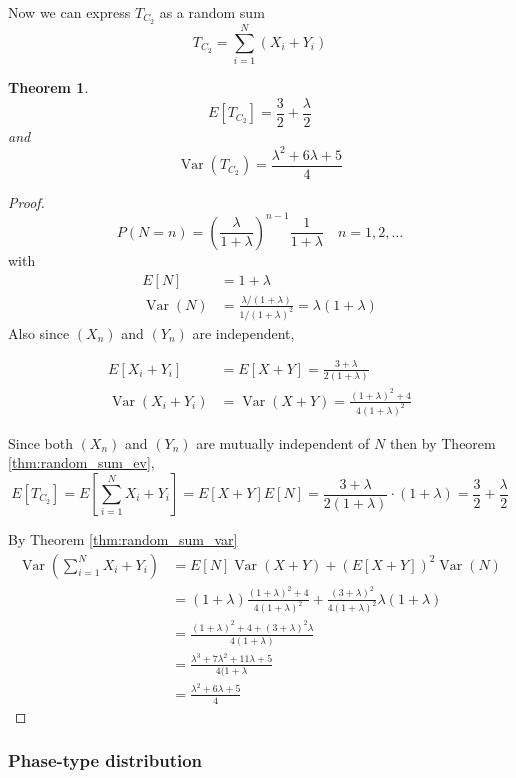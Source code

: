 \documentclass{article}
\theoremstyle{plain}
\newtheorem{theorem}{Theorem}[section]
\theoremstyle{definition}
\theoremstyle{remark}
\numberwithin{equation}{section}
\newcommand{\Var}{\operatorname {Var}}
\begin{document}
Now we can express $T_{C_2}$ as a random sum
$$
T_{C_2} = \sum_{i = 1}^N (X_i + Y_i)
$$

\begin{theorem}
$$
E[T_{C_2}] = \frac{3}{2} + \frac{\lambda}{2}
$$
and
$$
\Var(T_{C_2}) = \frac{\lambda^2 + 6 \lambda + 5}{4}
$$
\end{theorem}

\begin{proof}
$$
P(N = n) = \left(\frac{\lambda}{1 + \lambda} \right)^{n - 1} \frac{1}{1 + \lambda} \quad n = 1,2,\ldots
$$
with
\begin{align*}
    E[N] &= 1 + \lambda\\
    \Var(N) &= \frac{\lambda/(1 + \lambda)}{1/(1 + \lambda)^2} = \lambda (1 + \lambda)
\end{align*}
Also since $(X_n)$ and $(Y_n)$ are independent,

\begin{align*}
    E[X_i + Y_i] &= E[X + Y] = \frac{3 + \lambda}{2(1 + \lambda)}\\
    \Var(X_i + Y_i) &= \Var(X + Y) = \frac{(1 + \lambda)^2 + 4}{4(1 + \lambda)^2}
\end{align*}

Since both $(X_n)$ and $(Y_n)$ are mutually independent of $N$ then by Theorem \eqref{thm:random_sum_ev},
$$
E[T_{C_2}] = E\left[ \sum_{i = 1}^N X_i + Y_i \right] = E[X + Y] E[N] = \frac{3 + \lambda}{2(1 + \lambda)} \cdot (1 + \lambda) = \frac{3}{2} + \frac{\lambda}{2}
$$

By Theorem \ref{thm:random_sum_var}
\begin{align*}
    \Var\left( \sum_{i = 1}^N X_i + Y_i \right) &= E[N]\Var(X + Y) + (E[X + Y])^2 \Var(N)\\
    &= (1 + \lambda) \frac{(1 + \lambda)^2 + 4}{4(1 + \lambda)^2} + \frac{(3 + \lambda)^2}{4 (1 + \lambda)^2} \lambda (1 + \lambda)\\
    &= \frac{
        (1 + \lambda)^2 + 4 + (3 + \lambda)^2 \lambda
    }{4(1 + \lambda)}\\
    &= \frac{
    \lambda^3 + 7 \lambda^2 + 11 \lambda + 5
    }{4(1 + \lambda}\\
    &= \frac{\lambda^2 + 6 \lambda + 5}{4}
\end{align*}
\end{proof}

\subsubsection{Phase-type distribution}
\end{document}
